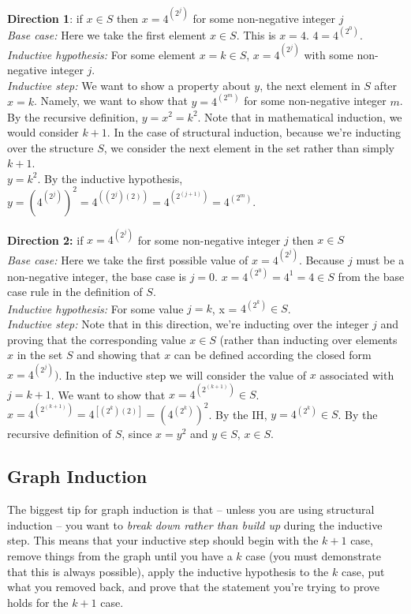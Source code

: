 \documentclass{article}
\theoremstyle{definition}
\begin{document}
\textbf{Direction 1}: if $x \in S$ then $x = 4^{(2^j)}$ for some non-negative integer $j$ \\
\textit{Base case:} Here we take the first element $x \in S$. This is $x = 4$. $4 = 4^{(2^0)}$. \\
\textit{Inductive hypothesis:} For some element $x = k \in S$, $x = 4^{(2^j)}$ with some non-negative integer $j$. \\
\textit{Inductive step:} We want to show a property about $y$, the next element in $S$ after $x = k$. Namely, we want to show that $y = 4^{(2^m)}$ for some non-negative integer $m$. \\
By the recursive definition, $y = x^2 = k^2$. Note that in mathematical induction, we would consider $k+1$. In the case of structural induction, because we're inducting over the structure $S$, we consider the next element in the set rather than simply $k+1$. \\
$y = k^2$. By the inductive hypothesis, $y = (4^{(2^j)})^2 = 4^{((2^j)(2))} = 4^{(2^{(j+1)})} = 4^{(2^m)}.$

\textbf{Direction 2:} if $x = 4^{(2^j)}$ for some non-negative integer $j$ then $x \in S$ \\
\textit{Base case:} Here we take the first possible value of $x = 4^{(2^j)}$. Because $j$ must be a non-negative integer, the base case is $j=0$. $x = 4^{(2^0)} = 4^1 = 4 \in S$ from the base case rule in the definition of $S$. \\
\textit{Inductive hypothesis:} For some value $j=k$, x = $4^{(2^k)} \in S$. \\
\textit{Inductive step:} Note that in this direction, we're inducting over the integer $j$ and proving that the corresponding value $x \in S$ (rather than inducting over elements $x$ in the set $S$ and showing that $x$ can be defined according the closed form $x=4^{(2^j)})$. In the inductive step we will consider the value of $x$ associated with  $j=k+1$. We want to show that $x=4^{(2^(k+1))} \in S$. \\
$x = 4^{(2^{(k+1)})} = 4^{[(2^k)(2)]} = (4^{(2^k)})^2$. By the IH, $y = 4^{(2^k)} \in S$. By the recursive definition of $S$, since $x = y^2$ and $y \in S$, $x \in S$.

\subsection*{Graph Induction}
The biggest tip for graph induction is that -- unless you are using structural induction -- you want to \textit{break down rather than build up} during the inductive step. This means that your inductive step should begin with the $k+1$ case, remove things from the graph until you have a $k$ case (you must demonstrate that this is always possible), apply the inductive  hypothesis to the $k$ case, put what you removed  back, and  prove that the statement you're trying to prove holds for the $k+1$ case. 
\end{document}
